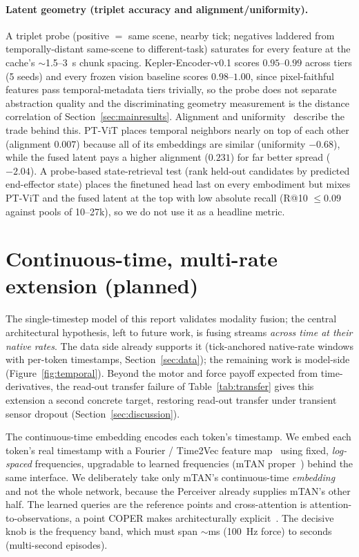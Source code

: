 \documentclass{article}
\begin{document}
\paragraph{Latent geometry (triplet accuracy and alignment/uniformity).} A triplet probe (positive $=$ same scene, nearby tick; negatives laddered from temporally-distant same-scene to different-task) saturates for every feature at the cache's $\sim$1.5--3~s chunk spacing. Kepler-Encoder-v0.1 scores $0.95$--$0.99$ across tiers (5 seeds) and every frozen vision baseline scores $0.98$--$1.00$, since pixel-faithful features pass temporal-metadata tiers trivially, so the probe does not separate abstraction quality and the discriminating geometry measurement is the distance correlation of Section~\ref{sec:mainresults}. Alignment and uniformity~\citep{wangisola2020} describe the trade behind this. PT-ViT places temporal neighbors nearly on top of each other (alignment $0.007$) because all of its embeddings are similar (uniformity $-0.68$), while the fused latent pays a higher alignment ($0.231$) for far better spread ($-2.04$). A probe-based state-retrieval test (rank held-out candidates by predicted end-effector state) places the finetuned head last on every embodiment but mixes PT-ViT and the fused latent at the top with low absolute recall (R@10 $\le 0.09$ against pools of 10--27k), so we do not use it as a headline metric.

\clearpage

\section{Continuous-time, multi-rate extension (planned)}
\label{sec:temporal}
The single-timestep model of this report validates modality fusion; the central architectural hypothesis, left to future work, is fusing streams \emph{across time at their native rates}. The data side already supports it (tick-anchored native-rate windows with per-token timestamps, Section~\ref{sec:data}); the remaining work is model-side (Figure~\ref{fig:temporal}). Beyond the motor and force payoff expected from time-derivatives, the read-out transfer failure of Table~\ref{tab:transfer} gives this extension a second concrete target, restoring read-out transfer under transient sensor dropout (Section~\ref{sec:discussion}).

The continuous-time embedding encodes each token's timestamp. We embed each token's real timestamp with a Fourier / Time2Vec feature map~\citep{time2vec2019} using fixed, \emph{log-spaced} frequencies, upgradable to learned frequencies (mTAN proper~\citep{mtan2021}) behind the same interface. We deliberately take only mTAN's continuous-time \emph{embedding} and not the whole network, because the Perceiver already supplies mTAN's other half. The learned queries are the reference points and cross-attention is attention-to-observations, a point COPER makes architecturally explicit~\citep{coper2022}. The decisive knob is the frequency band, which must span $\sim$ms (100~Hz force) to seconds (multi-second episodes).
\end{document}
